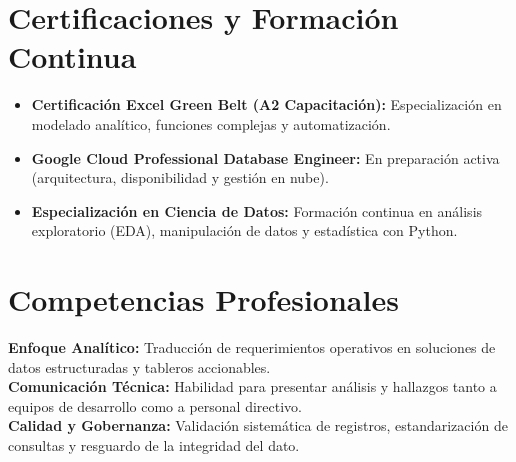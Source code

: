 \documentclass[10pt,letterpaper]{article}
\begin{document}
\section{Certificaciones y Formación Continua}
\begin{itemize}[leftmargin=12pt, itemsep=0pt, topsep=1pt, parsep=0pt]
    \item \textbf{Certificación Excel Green Belt (A2 Capacitación):} Especialización en modelado analítico, funciones complejas y automatización.
    \item \textbf{Google Cloud Professional Database Engineer:} En preparación activa (arquitectura, disponibilidad y gestión en nube).
    \item \textbf{Especialización en Ciencia de Datos:} Formación continua en análisis exploratorio (EDA), manipulación de datos y estadística con Python.
\end{itemize}

\section{Competencias Profesionales}
\textbf{Enfoque Analítico:} Traducción de requerimientos operativos en soluciones de datos estructuradas y tableros accionables.\\
\textbf{Comunicación Técnica:} Habilidad para presentar análisis y hallazgos tanto a equipos de desarrollo como a personal directivo.\\
\textbf{Calidad y Gobernanza:} Validación sistemática de registros, estandarización de consultas y resguardo de la integridad del dato.
\end{document}
